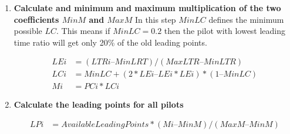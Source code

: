 \documentclass[gap.tex]{subfiles}
\begin{document}
\begin{enumerate}
    \item \textbf{Calculate and minimum and maximum multiplication of the two
        coefficients \(MinM\) and \(MaxM\)} In this step \(MinLC\) defines the
        minimum possible \(LC\). This means if \(MinLC = 0.2\) then the pilot
        with lowest leading time ratio will get only 20\% of the old leading
        points.
        
        \begin{align*}
            LEi &= (LTRi – MinLRT) / (MaxLTR – MinLTR) \\
            LCi &= MinLC + (2*LEi – LEi*LEi) * (1 – MinLC) \\
            Mi &= PCi * LCi
        \end{align*}
            
    \item \textbf{Calculate the leading points for all pilots}
        
        \begin{align*}
            LPi &= AvailableLeadingPoints * (Mi – MinM) / (MaxM – MinM )
        \end{align*}
\end{enumerate}
\end{document}
